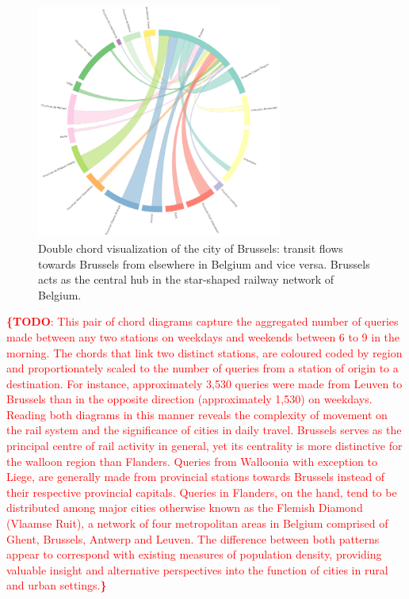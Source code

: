 \documentclass{sig-alternate}
\newcommand{\todo}[1]{\noindent\textcolor{red}{{\bf \{TODO}: #1{\bf \}}}}
\begin{document}
\begin{figure}
\centering
\includegraphics[width=8.1cm,align=center]{brussels}
\caption{Double chord visualization of the city of Brussels: transit flows towards Brussels from elsewhere in Belgium and vice versa. Brussels acts as the central hub in the star-shaped railway network of Belgium.}
\label{fig:brussels}
\end{figure}

\todo{This pair of chord diagrams capture the aggregated number of queries made between any two stations on weekdays and weekends between 6 to 9 in the morning. The chords that link two distinct stations, are coloured coded by region and proportionately scaled to the number of queries from a station of origin to a destination. For instance, approximately 3,530 queries were made from Leuven to Brussels than in the opposite direction (approximately 1,530) on weekdays. Reading both diagrams in this manner reveals the complexity of movement on the rail system and the significance of cities in daily travel. Brussels serves as the principal centre of rail activity in general, yet its centrality is more distinctive for the walloon region than Flanders. Queries from Walloonia with exception to Liege, are generally made from provincial stations towards Brussels instead of their respective provincial capitals. Queries in Flanders, on the hand, tend to be distributed among major cities otherwise known as the Flemish Diamond (Vlaamse Ruit), a network of four metropolitan areas in Belgium comprised of Ghent, Brussels, Antwerp and Leuven. The difference between both patterns appear to correspond with existing measures of population density, providing valuable insight and alternative perspectives into the function of cities in rural and urban settings.}
\end{document}
